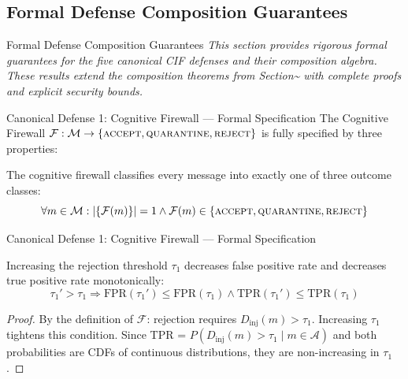 \documentclass[
  ignorenonframetext,
]{beamer}
\begin{document}
\subsection{Formal Defense Composition
Guarantees}\label{sec:defense-formal-guarantees}

\begin{frame}[allowframebreaks]{Formal Defense Composition Guarantees}
\emph{This section provides rigorous formal guarantees for the five
canonical CIF defenses and their composition algebra. These results
extend the composition theorems from
Section\textasciitilde{} with complete
proofs and explicit security bounds.}
\end{frame}

\begin{frame}[allowframebreaks]{Canonical Defense 1: Cognitive Firewall
--- Formal Specification}
\protect{}\label{canonical-defense-1-cognitive-firewall-formal-specification}
The Cognitive Firewall
\(\mathcal{F}: \mathcal{M} \to \{\textsc{accept}, \textsc{quarantine}, \textsc{reject}\}\)
is fully specified by three properties:

\begin{theorem}
\label{thm:firewall-completeness}
The cognitive firewall classifies every message into exactly one of three outcome classes:
\begin{equation}
\label{eq:firewall-completeness}
\forall m \in \mathcal{M}: |\{\mathcal{F}(m)\}| = 1 \land \mathcal{F}(m) \in \{\textsc{accept}, \textsc{quarantine}, \textsc{reject}\}
\end{equation}
\end{theorem}

\end{frame}

\begin{frame}[allowframebreaks]{Canonical Defense 1: Cognitive Firewall
--- Formal Specification}
\begin{theorem}
\label{thm:firewall-fpr-monotone}
Increasing the rejection threshold $\tau_1$ decreases false positive rate and decreases true positive rate monotonically:
\begin{equation}
\label{eq:firewall-fpr-monotone}
\tau_1' > \tau_1 \Rightarrow \text{FPR}(\tau_1') \leq \text{FPR}(\tau_1) \land \text{TPR}(\tau_1') \leq \text{TPR}(\tau_1)
\end{equation}
\end{theorem}

\begin{proof}
By the definition of $\mathcal{F}$: rejection requires $D_{\text{inj}}(m) > \tau_1$. Increasing $\tau_1$ tightens this condition. Since TPR = $P(D_{\text{inj}}(m) > \tau_1 \mid m \in \mathcal{A})$ and both probabilities are CDFs of continuous distributions, they are non-increasing in $\tau_1$.
\end{proof}

\end{frame}
\end{document}
